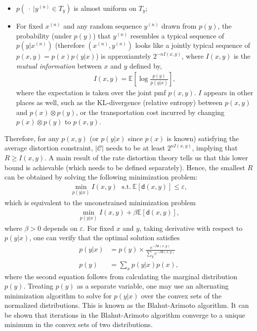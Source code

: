 \documentclass[10pt,a4paper]{amsart}
\numberwithin{equation}{section}
\theoremstyle{plain}
\theoremstyle{definition}
\def\E{{\mathbb E}}
\def\e{{\varepsilon}}
\begin{document}
\begin{itemize}
\medskip

\item $p(\ \cdot\  | y^{(n)}\in T_y)$ is almost uniform on $T_y$; 
\medskip

\item For fixed $x^{(n)}$ and any random sequence $y^{(n)}$ drawn from $p(y)$, the probability (under $p(y)$) that $y^{(n)}$ resembles a typical sequence of $p(y|x^{(n)})$ (therefore $(x^{(n)}, y^{(n)})$ looks like a jointly typical sequence of $p(x,y)=p(x)p(y|x)$) is approxiamtely $2^{-nI(x, y)}$, where $I(x,y)$ is the \emph{mutual information} between $x$ and $y$ defined by, 
\begin{align*}
I(x, y) = \E\left[\log\frac{p(y)}{p(y|x)}\right], 
\end{align*}
where the expectation is taken over the joint pmf $p(x,y)$. $I$ appears in other places as well, such as the KL-divergence (relative entropy) between $p(x,y)$ and $p(x)\otimes p(y)$, or the transportation cost incurred by changing $p(x)\otimes p(y)$ to $p(x, y)$.  
\end{itemize}
Therefore, for any $p(x, y)$ (or $p(y|x)$ since $p(x)$ is known) satisfying the average distortion constraint, $|\mathcal C|$ needs to be at least $2^{nI(x,y)}$, implying that $R\geq I(x, y)$. A main result of the rate distortion theory tells us that this lower bound is achievable (which needs to be defined separately). Hence, the smallest $R$ can be obtained by solving the following minimization problem:
\begin{align*}
\min_{p(y|x)} I(x,y)\ \ \ \text{s.t.}\ \E[\mathsf d(x,y)]\leq\e, 
\end{align*}
which is equivalent to the unconstrained minimization problem 
\begin{align*}
\min_{p(y|x)} I(x,y)+\beta\E[\mathsf d(x,y)],
\end{align*}
where $\beta>0$ depends on $\e$. For fixed $x$ and $y$, taking derivative with respect to $p(y|x)$, one can verify that the optimal solution satisfies
\begin{align*}
p(y|x) &= p(y)\times\frac{e^{-\beta\mathsf d(x, y)}}{\sum_{y}e^{-\beta\mathsf d(x, y)}}\\
p(y) & = \sum_{x}p(y|x)p(x),
\end{align*}
where the second equation follows from calculating the marginal distribution $p(y)$. Treating $p(y)$ as a separate variable, one may use an alternating minimization algorithm to solve for $p(y|x)$ over the convex sets of the normalized distributions. This is known as the Blahut-Arimoto algorithm. It can be shown that iterations in the Blahut-Arimoto algorithm converge to a unique minimum in the convex sets of two distributions. 
\end{document}
